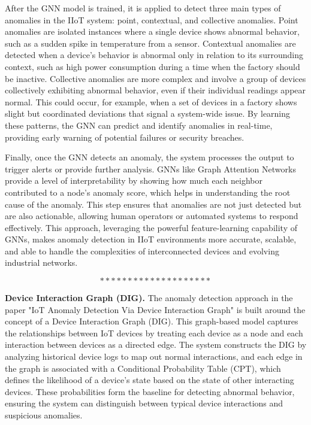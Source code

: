 After the GNN model is trained, it is applied to detect three main types of anomalies in the IIoT system: point, contextual, and collective anomalies. Point anomalies are isolated instances where a single device shows abnormal behavior, such as a sudden spike in temperature from a sensor. Contextual anomalies are detected when a device's behavior is abnormal only in relation to its surrounding context, such as high power consumption during a time when the factory should be inactive. Collective anomalies are more complex and involve a group of devices collectively exhibiting abnormal behavior, even if their individual readings appear normal. This could occur, for example, when a set of devices in a factory shows slight but coordinated deviations that signal a system-wide issue. By learning these patterns, the GNN can predict and identify anomalies in real-time, providing early warning of potential failures or security breaches.

Finally, once the GNN detects an anomaly, the system processes the output to trigger alerts or provide further analysis. GNNs like Graph Attention Networks provide a level of interpretability by showing how much each neighbor contributed to a node's anomaly score, which helps in understanding the root cause of the anomaly. This step ensures that anomalies are not just detected but are also actionable, allowing human operators or automated systems to respond effectively. This approach, leveraging the powerful feature-learning capability of GNNs, makes anomaly detection in IIoT environments more accurate, scalable, and able to handle the complexities of interconnected devices and evolving industrial networks\cite{73}.

$$********************$$

\textbf{Device Interaction Graph (DIG).} The anomaly detection approach in the paper "IoT Anomaly Detection Via Device Interaction Graph" is built around the concept of a Device Interaction Graph (DIG). This graph-based model captures the relationships between IoT devices by treating each device as a node and each interaction between devices as a directed edge. The system constructs the DIG by analyzing historical device logs to map out normal interactions, and each edge in the graph is associated with a Conditional Probability Table (CPT), which defines the likelihood of a device's state based on the state of other interacting devices. These probabilities form the baseline for detecting abnormal behavior, ensuring the system can distinguish between typical device interactions and suspicious anomalies.

